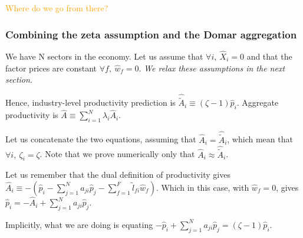 \documentclass[11pt]{article}
\begin{document}
\textcolor{orange}{Where do we go from there?}


\subsubsection{Combining the zeta assumption and the Domar aggregation}

We have N sectors in the economy.
Let us assume that $\forall i,~\hat{X}_i=0$ and that the factor prices are constant $\forall f, ~ \hat{w}_f =0$.\textit{ We relax these assumptions in the next section.}

Hence, industry-level productivity prediction is $\hat{\tilde{A}}_i \equiv (\zeta - 1) \hat{p}_i$.
Aggregate productivity is $\hat{A} \equiv\sum_{i=1}^N \lambda_i \hat{A}_i$. 

Let us concatenate the two equations, assuming that $\hat{A}_i= \hat{\tilde{A}}_i$, which mean that $\forall i,~\zeta_i=\zeta$. Note that we prove numerically only that $\hat{A}_i\approx \hat{\tilde{A}}_i$. 

Let us remember that the dual definition of productivity gives $\hat{A}_i \equiv - \left( \hat{p}_i - \sum_{j=1}^N  a_{ji} \hat{p}_j - \sum_{f=1}^F \tilde{l}_{fi} \hat{w}_f \right)$. Which in this case, with $\hat{w}_f =0$, gives $   \hat{p}_i=-\hat{A}_i + \sum_{j=1}^N  a_{ji} \hat{p}_j $.

Implicitly, what we are doing is equating $- \hat{p}_i + \sum_{j=1}^N  a_{ji} \hat{p}_j =(\zeta - 1) \hat{p}_i$. 
\end{document}
